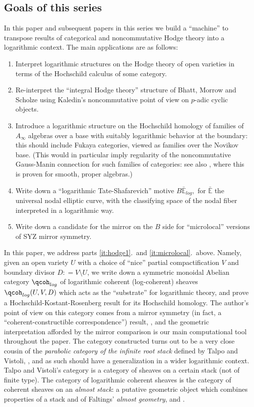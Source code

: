 \documentclass{article}
\newcommand{\ee}{\mathbb{E}}
\begin{document}
\subsection{Goals of this series}
In this paper and subsequent papers in this series we build a ``machine'' to transpose results of categorical and noncommutative Hodge theory into a logarithmic context. The main applications are as follows:
\begin{enumerate}
\item\label{it:hodge1} Interpret logarithmic structures on the Hodge theory of open varieties in terms of the Hochschild calculus of some category.
\item Re-interpret the ``integral Hodge theory'' structure \cite{bms} of Bhatt, Morrow and Scholze using Kaledin's noncommutative point of view \cite{kaledin1} on $p$-adic cyclic objects.
\item Introduce a logarithmic structure on the Hochschild homology of families of $A_\infty$ algebras over a base with suitably logarithmic behavior at the boundary: this should include Fukaya categories, viewed as families over the Novikov base. (This would in particular imply regularity of the noncommutative Gauss-Manin connection for such families of categories: see also \cite{pvv}, where this is proven for smooth, proper algebras.)
\item Write down a ``logarithmic Tate-Shafarevich'' motive $B\bar{\ee}_{log},$ for $\bar{\ee}$ the universal nodal elliptic curve, with the classifying space of the nodal fiber interpreted in a logarithmic way.
\item\label{it:microlocal} Write down a candidate for the mirror on the $B$ side for ``microlocal'' versions of SYZ mirror symmetry. 
\end{enumerate}
In this paper, we address parts \ref{it:hodge1}.\ and \ref{it:microlocal}.\ above. Namely, given an open variety $U$ with a choice of ``nice'' partial compactification $V$ and boundary divisor $D : = V\setminus U$, we write down a symmetric monoidal Abelian category $\qcoh_{log}$ of logarithmic coherent (log-coherent) sheaves $\qcoh_{log}(U, V, D)$ which acts as the ``substrate'' for logarithmic theory, and prove a Hochschild-Kostant-Rosenberg result for its Hochschild homology. The author's point of view on this category comes from a mirror symmetry (in fact, a ``coherent-constructible correspondence'') result, \cite{vtor}, and the geometric interpretation afforded by the mirror comparison is our main computational tool throughout the paper. The category constructed turns out to be a very close cousin of the \emph{parabolic category of the infinite root stack} defined by Talpo and Vistoli, \cite{talpo-vistoli}, and as such should have a generalization in a wider logarithmic context. Talpo and Vistoli's category is a category of sheaves on a certain stack (not of finite type). The category of logarithmic coherent sheaves is the category of coherent sheaves on an \emph{almost stack}: a putative geometric object which combines properties of a stack and of Faltings' \emph{almost geometry}, \cite{faltings} and \cite{gabber-romero}. 
\end{document}
